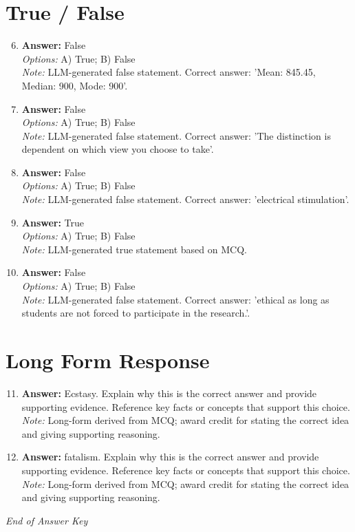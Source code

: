 \documentclass[12pt]{article}
\begin{document}
\section*{True / False}
\begin{enumerate}[label=\arabic*.]
\setcounter{enumi}{5}
\item \textbf{Answer:} False
\\ \textit{Options:} A) True; B) False
\\ \textit{Note:} LLM-generated false statement. Correct answer: 'Mean: 845.45, Median: 900, Mode: 900'.
\item \textbf{Answer:} False
\\ \textit{Options:} A) True; B) False
\\ \textit{Note:} LLM-generated false statement. Correct answer: 'The distinction is dependent on which view you choose to take'.
\item \textbf{Answer:} False
\\ \textit{Options:} A) True; B) False
\\ \textit{Note:} LLM-generated false statement. Correct answer: 'electrical stimulation'.
\item \textbf{Answer:} True
\\ \textit{Options:} A) True; B) False
\\ \textit{Note:} LLM-generated true statement based on MCQ.
\item \textbf{Answer:} False
\\ \textit{Options:} A) True; B) False
\\ \textit{Note:} LLM-generated false statement. Correct answer: 'ethical as long as students are not forced to participate in the research.'.
\end{enumerate}

\section*{Long Form Response}
\begin{enumerate}[label=\arabic*.]
\setcounter{enumi}{10}
\item \textbf{Answer:} Ecstasy. Explain why this is the correct answer and provide supporting evidence. Reference key facts or concepts that support this choice.
\\ \textit{Note:} Long-form derived from MCQ; award credit for stating the correct idea and giving supporting reasoning.
\item \textbf{Answer:} fatalism. Explain why this is the correct answer and provide supporting evidence. Reference key facts or concepts that support this choice.
\\ \textit{Note:} Long-form derived from MCQ; award credit for stating the correct idea and giving supporting reasoning.
\end{enumerate}

\vfill
\noindent\textit{End of Answer Key}
\end{document}
